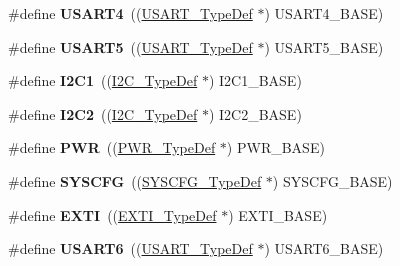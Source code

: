 \begin{DoxyCompactItemize}
\#define {\bfseries U\+S\+A\+R\+T4}~((\hyperlink{struct_u_s_a_r_t___type_def}{U\+S\+A\+R\+T\+\_\+\+Type\+Def} $\ast$) U\+S\+A\+R\+T4\+\_\+\+B\+A\+SE)
\item 
\mbox{\label{group___peripheral__declaration_gad50fb4c49d43b2144ee2f8cbdfb9a640}} 
\#define {\bfseries U\+S\+A\+R\+T5}~((\hyperlink{struct_u_s_a_r_t___type_def}{U\+S\+A\+R\+T\+\_\+\+Type\+Def} $\ast$) U\+S\+A\+R\+T5\+\_\+\+B\+A\+SE)
\item 
\mbox{\label{group___peripheral__declaration_gab45d257574da6fe1f091cc45b7eda6cc}} 
\#define {\bfseries I2\+C1}~((\hyperlink{struct_i2_c___type_def}{I2\+C\+\_\+\+Type\+Def} $\ast$) I2\+C1\+\_\+\+B\+A\+SE)
\item 
\mbox{\label{group___peripheral__declaration_gafa60ac20c1921ef1002083bb3e1f5d16}} 
\#define {\bfseries I2\+C2}~((\hyperlink{struct_i2_c___type_def}{I2\+C\+\_\+\+Type\+Def} $\ast$) I2\+C2\+\_\+\+B\+A\+SE)
\item 
\mbox{\label{group___peripheral__declaration_ga04651c526497822a859942b928e57f8e}} 
\#define {\bfseries P\+WR}~((\hyperlink{struct_p_w_r___type_def}{P\+W\+R\+\_\+\+Type\+Def} $\ast$) P\+W\+R\+\_\+\+B\+A\+SE)
\item 
\mbox{\label{group___peripheral__declaration_ga3c833fe1c486cb62250ccbca32899cb8}} 
\#define {\bfseries S\+Y\+S\+C\+FG}~((\hyperlink{struct_s_y_s_c_f_g___type_def}{S\+Y\+S\+C\+F\+G\+\_\+\+Type\+Def} $\ast$) S\+Y\+S\+C\+F\+G\+\_\+\+B\+A\+SE)
\item 
\mbox{\label{group___peripheral__declaration_ga9189e770cd9b63dadd36683eb9843cac}} 
\#define {\bfseries E\+X\+TI}~((\hyperlink{struct_e_x_t_i___type_def}{E\+X\+T\+I\+\_\+\+Type\+Def} $\ast$) E\+X\+T\+I\+\_\+\+B\+A\+SE)
\item 
\mbox{\label{group___peripheral__declaration_ga2dab39a19ce3dd05fe360dcbb7b5dc84}} 
\#define {\bfseries U\+S\+A\+R\+T6}~((\hyperlink{struct_u_s_a_r_t___type_def}{U\+S\+A\+R\+T\+\_\+\+Type\+Def} $\ast$) U\+S\+A\+R\+T6\+\_\+\+B\+A\+SE)
\item 

\end{DoxyCompactItemize}
